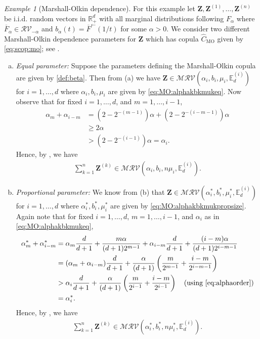 \documentclass[aos]{imsart}
\numberwithin{equation}{section}
\theoremstyle{plain} %
\theoremstyle{remark}
\newtheorem{example}[theorem]{Example}
\newcommand{\beao}{\begin{eqnarray*}}
\newcommand{\eeao}{\end{eqnarray*}\noindent}
\newcommand{\E}{\mathbb{E}}
\newcommand{\R}{\mathbb{R}}
\newcommand{\MO}{\mathrm{MO}}
\def\MRV{\mathcal{MRV}}
\def\RV{\mathcal{RV}}
\def\bZ{\boldsymbol Z}
\begin{document}
\begin{example}[Marshall-Olkin dependence] \label{example:Mashall-Olkin}
For this example let $\bZ,\bZ^{(1)},\ldots,\bZ^{(n)}$ be  i.i.d.  random vectors in $\R_+^d$ with all marginal distributions following $F_{\alpha}$ where $\overline{F}_{\alpha}\in \RV_{-\alpha}$ and $b_{\alpha}(t)=\overline{F}^{\leftarrow}(1/t)$ for some $\alpha>0$. We consider two different Marshall-Olkin dependence parameters for $\bZ$ which has copula $\widehat{C}_{\MO}$ given by \eqref{eq:scop:mo}; see .
\begin{enumerate}[(a)]
    \item \emph{Equal parameter:} Suppose the parameters  defining the Marshall-Olkin copula are given by \eqref{def:beta}. Then from (a) we have $ \bZ\in \MRV(\alpha_i, b_i, \mu_i,\E_d^{(i)})$ for $i=1,\ldots, d$ where  {$\alpha_i, b_i, \mu_i$ } are given by \eqref{eq:MO:alphakbkmukeq}. Now observe that for fixed  $i=1,\ldots, d$, and \linebreak $m=1,\ldots, i-1$,
    \begin{align}
        \alpha_{m}+\alpha_{i-m} & = (2-2^{-(m-1)})\alpha + (2-2^{-(i-m-1)})\alpha \nonumber\\
        & \ge 2\alpha \nonumber\\
        &> (2-2^{-(i-1)})\alpha = \alpha_i. \label{eq:alphaorder}
    \end{align}
    Hence, by , we have
     \beao
                        \sum_{k=1}^n\bZ^{(k)}\in\MRV(\alpha_i,b_i,n\mu_i,\E_d^{(i)}).
                \eeao
 \item \emph{Proportional parameter:}  We know from (b) that $ \bZ\in \MRV(\alpha_i^*, b_i^*, \mu_i^*,\E_d^{(i)})$ for $i=1,\ldots, d$ where $\alpha_i^*, b_i^*, \mu_i^*$ are given by \eqref{eq:MO:alphakbkmukpropsize}. Again note that for fixed $i=1,\ldots, d$, $m=1,\ldots, i-1$, and $\alpha_i$  as in \eqref{eq:MO:alphakbkmukeq},
    \begin{align*}
        \alpha_{m}^*+\alpha_{i-m}^* & = \alpha_m\frac{d}{d+1}+ \frac{m\alpha}{(d+1)2^{m-1}}+ \alpha_{i-m}\frac{d}{d+1}+ \frac{(i-m)\alpha}{(d+1)2^{i-m-1}}\\
        & = (\alpha_m+\alpha_{i-m})\frac{d}{d+1} + \frac{\alpha}{(d+1)}\left(\frac{m}{2^{m-1}} + \frac{i-m}{2^{i-m-1}}\right)\\
        & > \alpha_i\frac{d}{d+1} + \frac{\alpha}{(d+1)}\left(\frac{m}{2^{i-1}} + \frac{i-m}{2^{i-1}}\right) \quad \text{(using \eqref{eq:alphaorder})}\\
       & = \alpha_i^*.
    \end{align*}
    Hence, by , we have
     \beao
                        \sum_{k=1}^n\bZ^{(k)}\in\MRV(\alpha_i^*,b_i^*,n\mu_i^*,\E_d^{(i)}).
                \eeao
\end{enumerate}
\end{example}
\end{document}
